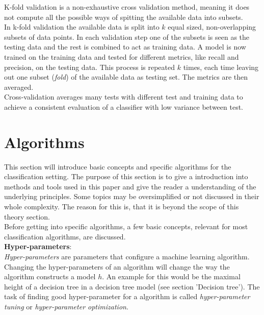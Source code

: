 K-fold validation is a non-exhaustive cross validation method, meaning it does not compute all the possible ways of spitting the available data into subsets. \\
In k-fold validation the available data is split into $k$ equal sized, non-overlapping subsets of data points. In each validation step one of the subsets is seen as the testing data and the rest is combined to act as training data. A model is now trained on the training data and tested for different metrics, like recall and precision, on the testing data. This process is repeated $k$ times, each time leaving out one subset (\emph{fold}) of the available data as testing set. The metrics are then averaged.
\\

Cross-validation averages many tests with different test and training data to achieve a consistent evaluation of a classifier with low variance between test.

\section{Algorithms}
This section will introduce basic concepts and specific algorithms for the classification setting. The purpose of this section is to give a introduction into methods and tools used in this paper and give the reader a understanding of the underlying principles. Some topics may be oversimplified or not discussed in their whole complexity. The reason for this is, that it is beyond the scope of this theory section.
\\

Before getting into specific algorithms, a few basic concepts, relevant for most classification algorithms, are discussed.
\\

\textbf{Hyper-parameters}: \\
\emph{Hyper-parameters} are parameters that configure a machine learning algorithm. Changing the hyper-parameters of an algorithm will change the way the algorithm constructs a model $h$. An example for this would be the maximal height of a decision tree in a decision tree model (see section 'Decision tree'). The task of finding good hyper-parameter for a algorithm is called \emph{hyper-parameter tuning} or \emph{hyper-parameter optimization}.

